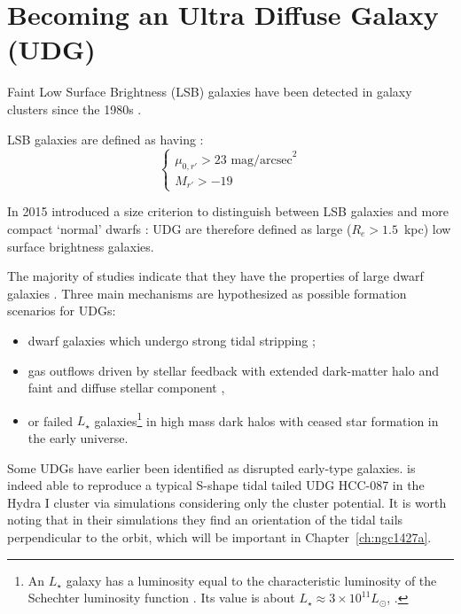 \section{Becoming an Ultra Diffuse Galaxy (UDG)}
\label{sec:UDG}

Faint Low Surface Brightness (LSB) galaxies have been detected in galaxy clusters since the 1980s \citep[e.g.][]{Sandage1984}.

LSB galaxies are defined as having \citep{Venhola2017}:
\begin{equation}
\begin{cases}
 \mu_{0,r'} > 23 \mbox{ mag/arcsec}^2\\
 M_{r'} > -19
\end{cases}
\end{equation}

In 2015 \citet{VanDokkum2015} introduced a size criterion to distinguish between LSB galaxies and more compact `normal' dwarfs \citep{Sales2021}:
UDG are therefore defined as large ($R_e > 1.5$~kpc) low surface brightness galaxies.

The majority of studies indicate that they have the properties of large dwarf galaxies \citep{Sandage1984, Roman2017, Venhola2017, Saifollahi2021}.
Three main mechanisms are hypothesized as possible formation scenarios for UDGs:
\begin{itemize}
  \item dwarf galaxies which undergo strong tidal stripping \citep{Venhola2017, Carleton2018, Rong2020a};
  \item gas outflows driven by stellar feedback with extended dark-matter halo and faint and diffuse stellar component \citep{DiCintio2017, ManceraPina2019},
  \item or failed $L_\star$ galaxies\footnote{An $L_\star$ galaxy has a luminosity equal to the characteristic luminosity of the Schechter luminosity function \citep{Press1974}.
  Its value is about $L_\star \approx 3\times10^{11}L_\odot$, \cf{}  \citet{Cooray2005}.}
in high mass dark halos with ceased star formation in the early universe.
\end{itemize}
Some UDGs have earlier been identified as disrupted early-type galaxies.
\citet{Koch2012} is indeed able to reproduce a typical S-shape tidal tailed UDG HCC-087 in the Hydra I cluster via simulations considering only the cluster potential.
It is worth noting that in their simulations they find an orientation of the tidal tails perpendicular to the orbit, which will be important in Chapter~\ref{ch:ngc1427a}.

